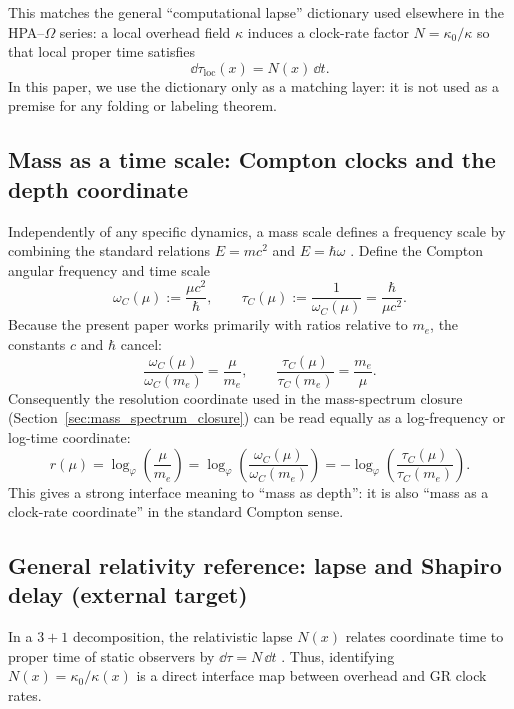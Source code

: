 This matches the general ``computational lapse'' dictionary used elsewhere in the HPA--$\Omega$ series: a local overhead field $\kappa$ induces a clock-rate factor $N=\kappa_0/\kappa$ so that local proper time satisfies
\begin{equation}
\label{eq:dtau_lapse_dictionary}
\dd\tau_{\mathrm{loc}}(x)=N(x)\,\dd t.
\end{equation}
In this paper, we use the dictionary only as a matching layer: it is not used as a premise for any folding or labeling theorem.

\subsection{Mass as a time scale: Compton clocks and the depth coordinate}
\label{app:compton_clock_dictionary}

Independently of any specific dynamics, a mass scale defines a frequency scale by combining the standard relations $E=mc^2$ and $E=\hbar\omega$ \cite{Einstein1905,NielsenChuang2010}.
Define the Compton angular frequency and time scale
\begin{equation}
\label{eq:compton_clock}
\omega_C(\mu):=\frac{\mu c^2}{\hbar},
\qquad
\tau_C(\mu):=\frac{1}{\omega_C(\mu)}=\frac{\hbar}{\mu c^2}.
\end{equation}
Because the present paper works primarily with ratios relative to $m_e$, the constants $c$ and $\hbar$ cancel:
\[
\frac{\omega_C(\mu)}{\omega_C(m_e)}=\frac{\mu}{m_e},
\qquad
\frac{\tau_C(\mu)}{\tau_C(m_e)}=\frac{m_e}{\mu}.
\]
Consequently the resolution coordinate used in the mass-spectrum closure (Section~\ref{sec:mass_spectrum_closure}) can be read equally as a log-frequency or log-time coordinate:
\begin{equation}
\label{eq:r_as_log_compton}
r(\mu)=\log_\varphi\!\left(\frac{\mu}{m_e}\right)
=\log_\varphi\!\left(\frac{\omega_C(\mu)}{\omega_C(m_e)}\right)
=-\log_\varphi\!\left(\frac{\tau_C(\mu)}{\tau_C(m_e)}\right).
\end{equation}
This gives a strong interface meaning to ``mass as depth'': it is also ``mass as a clock-rate coordinate'' in the standard Compton sense.

\subsection{General relativity reference: lapse and Shapiro delay (external target)}
\label{app:gr_lapse_shapiro_target}

In a $3{+}1$ decomposition, the relativistic lapse $N(x)$ relates coordinate time to proper time of static observers by $\dd\tau=N\,\dd t$ \cite{Wald1984}.
Thus, identifying $N(x)=\kappa_0/\kappa(x)$ is a direct interface map between overhead and GR clock rates.

